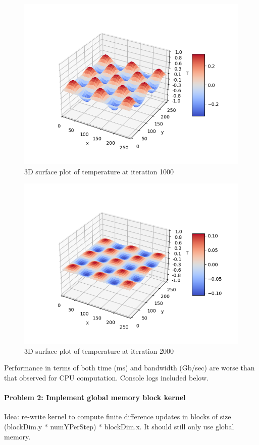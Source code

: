 \documentclass[12pt,letterpaper,twoside]{article}
\begin{document}
\begin{figure}[h]
    \center
    \includegraphics[scale=0.7]{global_1000.png}
    \caption{3D surface plot of temperature at iteration 1000}
\end{figure}

\begin{figure}[h]
    \center
    \includegraphics[scale=0.7]{global_2000.png}
    \caption{3D surface plot of temperature at iteration 2000}
\end{figure}

Performance in terms of both time (ms) and bandwidth (Gb/sec) are worse than
that observed for CPU computation. Console logs included below.


\paragraph{Problem 2: Implement global memory block kernel } Idea: re-write kernel to 
compute finite difference updates in blocks of size (blockDim.y * numYPerStep) 
* blockDim.x. It should still only use global memory.
\end{document}
